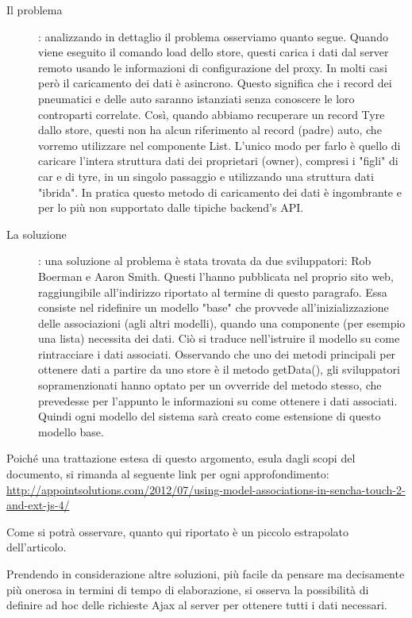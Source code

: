\documentclass[10pt,a4paper,onecolumn]{article}
\begin{document}
\begin{description}
	\item[Il problema]: analizzando in dettaglio il problema osserviamo quanto segue. Quando viene eseguito il comando load dello store, questi carica i dati dal server remoto usando le informazioni di configurazione del proxy. In molti casi però il caricamento dei dati è asincrono. Questo significa che i record dei pneumatici e delle auto saranno istanziati senza conoscere le loro controparti correlate. Così, quando abbiamo recuperare un record Tyre dallo store, questi non ha alcun riferimento al record (padre) auto, che vorremo utilizzare nel componente List. L'unico modo per farlo è quello di caricare l'intera struttura dati dei proprietari (owner), compresi i "figli" di car e di tyre, in un singolo passaggio e utilizzando una struttura dati "ibrida". In pratica questo metodo di caricamento dei dati è ingombrante e per lo più non supportato dalle tipiche backend's API.
	\item[La soluzione]: una soluzione al problema è stata trovata da due sviluppatori: Rob Boerman e Aaron Smith. Questi l'hanno pubblicata nel proprio sito web, raggiungibile all'indirizzo riportato al termine di questo paragrafo. Essa consiste nel ridefinire un modello "base" che provvede all'inizializzazione delle associazioni (agli altri modelli), quando una componente (per esempio una lista) necessita dei dati. Ciò si traduce nell'istruire il modello su come rintracciare i dati associati.
	Osservando che uno dei metodi principali per ottenere dati a partire da uno store è il metodo getData(), gli sviluppatori sopramenzionati hanno optato per un ovverride del metodo stesso, che prevedesse per l'appunto le informazioni su come ottenere i dati associati. Quindi ogni modello del sistema sarà creato come estensione di questo modello base.
\end{description}

Poiché una trattazione estesa di questo argomento, esula dagli scopi del documento, si rimanda al seguente link per ogni approfondimento:
\url{http://appointsolutions.com/2012/07/using-model-associations-in-sencha-touch-2-and-ext-js-4/}

Come si potrà osservare, quanto qui riportato è un piccolo estrapolato dell'articolo.

Prendendo in considerazione altre soluzioni, più facile da pensare ma decisamente più onerosa in termini di tempo di elaborazione, si osserva la possibilità di definire ad hoc delle richieste Ajax al server per ottenere tutti i dati necessari.
\end{document}
